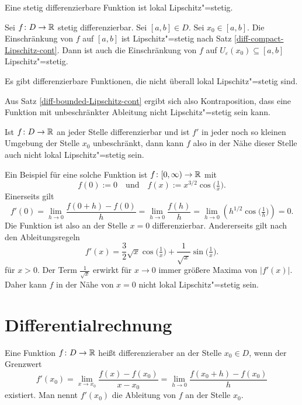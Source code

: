 \begin{Korollar}
Eine stetig differenzierbare Funktion ist lokal Lipschitz"=stetig.
\end{Korollar}
\begin{Beweis}
Sei $f\colon D\to\mathbb R$ stetig differenzierbar. Sei $[a,b]\in D$. Sei
$x_0\in [a,b]$. Die Einschränkung von $f$ auf $[a,b]$ ist
Lipschitz"=stetig nach Satz \ref{diff-compact-Lipschitz-cont}.
Dann ist auch die Einschränkung von $f$ auf
$U_\varepsilon(x_0)\subseteq [a,b]$ Lipschitz"=stetig.\;\qedsymbol
\end{Beweis}

\begin{Satz}
Es gibt differenzierbare Funktionen, die nicht überall lokal
Lipschitz"=stetig sind.
\end{Satz}
\begin{Beweis}
Aus Satz \ref{diff-bounded-Lipschitz-cont} ergibt sich also
Kontraposition, dass eine Funktion mit unbeschränkter Ableitung
nicht Lipschitz"=stetig sein kann.

Ist $f\colon D\to\mathbb R$ an jeder Stelle differenzierbar und ist $f'$
in jeder noch so kleinen Umgebung der Stelle $x_0$ unbeschränkt, dann
kann $f$ also in der Nähe dieser Stelle auch nicht lokal
Lipschitz"=stetig sein.

Ein Beispiel für eine solche Funktion ist $f\colon{}[0,\infty)\to\mathbb R$
mit
\[f(0):=0\quad \text{und}\quad f(x):=x^{3/2}\cos\Big(\tfrac{1}{x}\Big).\]
Einerseits gilt
\[f'(0) = \lim_{h\to 0}\frac{f(0+h)-f(0)}{h} = \lim_{h\to 0}\frac{f(h)}{h}
= \lim_{h\to 0} (h^{1/2}\cos\Big(\tfrac{1}{h}\Big)) = 0.\]
Die Funktion ist also an der Stelle $x=0$ differenzierbar.
Andererseits gilt nach den Ableitungsregeln%
\[f'(x) = \frac{3}{2}\sqrt{x}\cos\Big(\tfrac{1}{x}\Big)+\frac{1}{\sqrt{x}}\sin\Big(\tfrac{1}{x}\Big).\]
für $x>0$. Der Term $\tfrac{1}{\sqrt{x}}$ erwirkt für $x\to 0$ immer
größere Maxima von $|f'(x)|$. Daher kann $f$ in der Nähe von $x=0$ nicht
lokal Lipschitz"=stetig sein.\;\qedsymbol
\end{Beweis}

\section{Differentialrechnung}
\begin{Definition}\label{diff}
Eine Funktion $f\colon D\to\mathbb R$ heißt differenzieraber an der Stelle
$x_0\in D$, wenn der Grenzwert%
\[f'(x_0) = \lim_{x\to x_0}\frac{f(x)-f(x_0)}{x-x_0}
= \lim_{h\to 0}\frac{f(x_0+h)-f(x_0)}{h}\]
existiert. Man nennt $f'(x_0)$ die Ableitung von $f$ an der Stelle
$x_0$.
\end{Definition}

